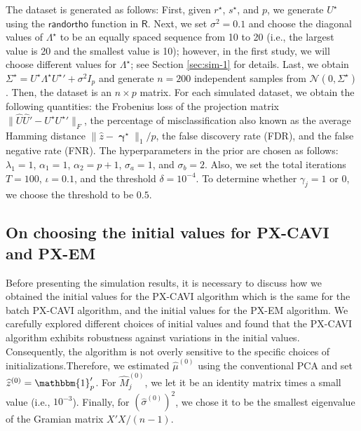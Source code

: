 \documentclass[pdftex, noinfoline, letter]{imsart}
\DeclareMathOperator*{\bgamma}{\boldsymbol{\gamma}}
\theoremstyle{plain}
\begin{document}
The dataset is generated as follows:
First, given $r^\star$, $s^\star$, and $p$, we generate $U^\star$ using the $\mathsf{randortho}$ function in $\mathsf{R}$.
Next, we set $\sigma^2 = 0.1$ and choose the diagonal values of $\Lambda^\star$ to be an equally spaced sequence from 10 to 20 (i.e., the largest value is 20 and the smallest value is 10); however, in the first study, we will choose different values for $\Lambda^\star$; see Section \ref{sec:sim-1} for details.
Last, we obtain $\Sigma^\star = U^\star \Lambda^\star {U^\star}' + \sigma^2 I_p$ and generate $n = 200$ independent samples from $\mathcal{N}(0, \Sigma^\star)$. Then, the dataset is an $n \times p$ matrix. 
For each simulated dataset, we obtain the following quantities: the Frobenius loss of the projection matrix $\|\widehat  U\widehat  U' - U^\star {U^\star}'\|_F$, 
the percentage of misclassification also known as the average Hamming distance
$\|\widehat  z - \bgamma^\star\|_1/p$,  the false discovery rate (FDR), and the false negative rate (FNR). 
The hyperparameters in the prior are chosen as follows: $\lambda_1 = 1$, $\alpha_1 = 1$, $\alpha_2 = p + 1$, $\sigma_a = 1$, and $\sigma_b = 2$. Also, we set the total iterations $T = 100$, $\iota = 0.1$, and the threshold $\delta = 10^{-4}$. To determine whether $\gamma_j = 1$ or $0$, we choose the threshold to be $0.5$.


\subsection{On choosing the initial values for PX-CAVI and PX-EM}
\label{sec:initial-values}

Before presenting the simulation results, it is necessary to discuss how we obtained the initial values for the PX-CAVI algorithm which is the same for the batch PX-CAVI algorithm, and the initial values for the PX-EM algorithm. 
We carefully explored different choices of initial values and found that the PX-CAVI algorithm exhibits robustness against variations in the initial values. Consequently, the algorithm is not overly sensitive to the specific choices of initializations.Therefore, we estimated $\widehat \mu^{(0)}$ using the conventional PCA and set $\widehat  z^{(0)} = \mathbbm{1}_p'$. For $\widehat M_j^{(0)}$, we let it be an identity matrix times a small value (i.e., $10^{-3}$). Finally, for $(\widehat \sigma^{(0)})^2$, we chose it to be the smallest eigenvalue of the Gramian matrix $X'X/(n-1)$. 
\end{document}
